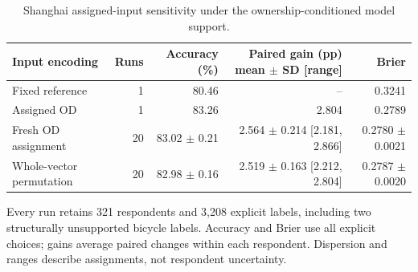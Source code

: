 \begin{table}[pos=htbp]
\centering\footnotesize
\caption{Shanghai assigned-input sensitivity under the ownership-conditioned model support.}
\label{tab:od_sensitivity}
\setlength{\tabcolsep}{3pt}
\renewcommand{\arraystretch}{1.15}
\begin{tabular}{@{}lrrrr@{}}
\toprule
Input encoding & Runs & Accuracy (\%) & \shortstack{Paired gain (pp)\\mean $\pm$ SD [range]} & Brier \\
\midrule
Fixed reference & 1 & 80.46 & -- & 0.3241 \\
Assigned OD & 1 & 83.26 & 2.804 & 0.2789 \\
Fresh OD assignment & 20 & 83.02 $\pm$ 0.21 & \shortstack{2.564 $\pm$ 0.214\\{}[2.181, 2.866]} & 0.2780 $\pm$ 0.0021 \\
Whole-vector permutation & 20 & 82.98 $\pm$ 0.16 & \shortstack{2.519 $\pm$ 0.163\\{}[2.212, 2.804]} & 0.2787 $\pm$ 0.0020 \\
\bottomrule
\end{tabular}
\par\smallskip\begin{minipage}{0.98\textwidth}\footnotesize Every run retains 321 respondents and 3,208 explicit labels, including two structurally unsupported bicycle labels. Accuracy and Brier use all explicit choices; gains average paired changes within each respondent. Dispersion and ranges describe assignments, not respondent uncertainty. \end{minipage}
\end{table}
